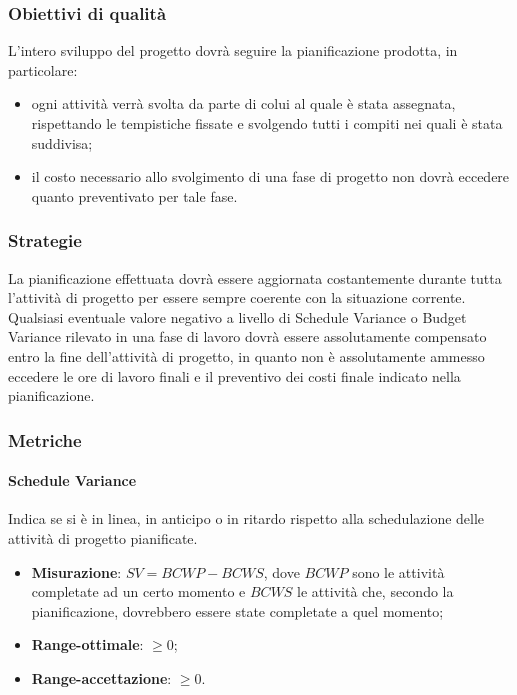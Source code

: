 \subsubsection{Obiettivi di qualità}
L'intero sviluppo del progetto dovrà seguire la pianificazione prodotta, in particolare:
\begin{itemize}
\item ogni attività verrà svolta da parte di colui al quale è stata assegnata, rispettando le tempistiche fissate e svolgendo tutti i compiti nei quali è stata suddivisa;
\item il costo necessario allo svolgimento di una fase di progetto non dovrà eccedere quanto preventivato per tale fase.
\end{itemize}
\subsubsection{Strategie}
La pianificazione effettuata dovrà essere aggiornata costantemente durante tutta l'attività di progetto per essere sempre coerente con la situazione corrente.\\
Qualsiasi eventuale valore negativo a livello di Schedule Variance o  Budget Variance rilevato in una fase di lavoro dovrà essere assolutamente compensato entro la fine dell'attività di progetto, in quanto non è assolutamente ammesso eccedere le ore di lavoro finali e il preventivo dei costi finale indicato nella pianificazione.
\subsubsection{Metriche}
\paragraph{Schedule Variance}
\label{scheduleVariance}
Indica se si è in linea, in anticipo o in ritardo rispetto alla schedulazione delle attività di progetto pianificate.
\begin{itemize}
\item \textbf{Misurazione}: $SV = BCWP - BCWS$, dove $BCWP$ sono le attività completate ad un certo momento e $BCWS$ le attività che, secondo la pianificazione, dovrebbero essere state completate a quel momento;
\item \textbf{Range-ottimale}: $\geq 0$;
\item \textbf{Range-accettazione}: $\geq 0$.
\end{itemize}
